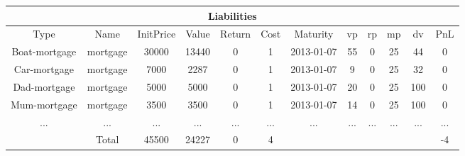 \begin{longtable}{|c|c|c|c|c|c|c|c|c|c|c|c|}
\hline
\multicolumn{12}{|c|}{Liabilities} \\
\hline
Type & Name & InitPrice & Value & Return & Cost & Maturity & vp & rp & mp & dv & PnL\\
\hline
Boat-mortgage & mortgage & 30000 & 13440 & 0 & 1 & 2013-01-07 & 55 & 0 & 25 & 44 & 0\\
\hline
Car-mortgage & mortgage & 7000 & 2287 & 0 & 1 & 2013-01-07 & 9 & 0 & 25 & 32 & 0\\
\hline
Dad-mortgage & mortgage & 5000 & 5000 & 0 & 1 & 2013-01-07 & 20 & 0 & 25 & 100 & 0\\
\hline
Mum-mortgage & mortgage & 3500 & 3500 & 0 & 1 & 2013-01-07 & 14 & 0 & 25 & 100 & 0\\
\hline
 ... & ... & ... & ... & ... & ... & ... & ... & ... & ... & ... & ...\\
\hline
& Total & 45500 & 24227 & 0 & 4 & & & & & & -4\\
\hline
\end{longtable}
